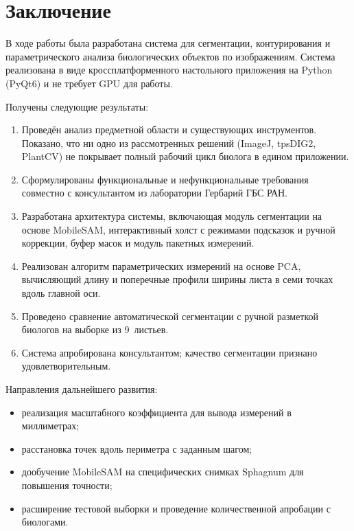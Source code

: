 
\section*{Заключение}
\label{sec:conclusion}

В ходе работы была разработана система для сегментации, контурирования и параметрического
анализа биологических объектов по изображениям.
Система реализована в виде кроссплатформенного настольного приложения на Python (PyQt6)
и не требует GPU для работы.

Получены следующие результаты:

\begin{enumerate}
    \item Проведён анализ предметной области и существующих инструментов.
          Показано, что ни одно из рассмотренных решений (ImageJ, tpsDIG2, PlantCV)
          не покрывает полный рабочий цикл биолога в едином приложении.

    \item Сформулированы функциональные и нефункциональные требования совместно с консультантом
          из лаборатории Гербарий ГБС РАН.

    \item Разработана архитектура системы, включающая модуль сегментации на основе MobileSAM,
          интерактивный холст с режимами подсказок и ручной коррекции,
          буфер масок и модуль пакетных измерений.

    \item Реализован алгоритм параметрических измерений на основе PCA,
          вычисляющий длину и поперечные профили ширины листа в семи точках вдоль главной оси.

    \item Проведено сравнение автоматической сегментации с ручной разметкой биологов
          на выборке из 9~листьев.

    \item Система апробирована консультантом; качество сегментации признано удовлетворительным.
\end{enumerate}

Направления дальнейшего развития:
\begin{itemize}
    \item реализация масштабного коэффициента для вывода измерений в миллиметрах;
    \item расстановка точек вдоль периметра с заданным шагом;
    \item дообучение MobileSAM на специфических снимках Sphagnum для повышения точности;
    \item расширение тестовой выборки и проведение количественной апробации с биологами.
\end{itemize}
